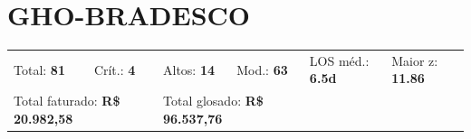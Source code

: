\documentclass[a4paper,10pt]{article}
\begin{document}
\clearpage
\section{GHO-BRADESCO}
\begin{tcolorbox}[colback=lightblue,colframe=jcubeblue,title={\textbf{Resumo --- GHO-BRADESCO}}]
\begin{tabular}{ll@{\quad}ll@{\quad}ll}
Total: \textbf{81} &
Cr\'{i}t.: \textcolor{anomred}{\textbf{4}} &
Altos: \textcolor{anomorange}{\textbf{14}} &
Mod.: \textcolor{anomyellow}{\textbf{63}} &
LOS m\'{e}d.: \textbf{6.5d} &
Maior z: \textbf{11.86} \\

\multicolumn{2}{l}{Total faturado: \textbf{R\$ 20.982,58}} & 
\multicolumn{2}{l}{\textcolor{anomred}{Total glosado: \textbf{R\$ 96.537,76}}} & & \\

\end{tabular}
\end{tcolorbox}
\end{document}
